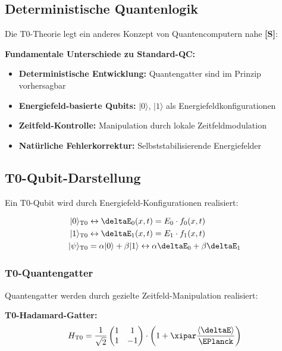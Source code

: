 	\subsection{Deterministische Quantenlogik}
	
	Die T0-Theorie legt ein anderes Konzept von Quantencomputern nahe \textbf{[S]}:
	
	\begin{tcolorbox}[colback=yellow!5!white,colframe=yellow!75!black,title=T0-Quantencomputer-Prinzipien]
		\textbf{Fundamentale Unterschiede zu Standard-QC:}
		\begin{itemize}
			\item \textbf{Deterministische Entwicklung:} Quantengatter sind im Prinzip vorhersagbar
			\item \textbf{Energiefeld-basierte Qubits:} $|0\rangle$, $|1\rangle$ als Energiefeldkonfigurationen
			\item \textbf{Zeitfeld-Kontrolle:} Manipulation durch lokale Zeitfeldmodulation
			\item \textbf{Natürliche Fehlerkorrektur:} Selbststabilisierende Energiefelder
		\end{itemize}
	\end{tcolorbox}
	
	\subsection{T0-Qubit-Darstellung}
	
	Ein T0-Qubit wird durch Energiefeld-Konfigurationen realisiert:
	
	\begin{align}
		|0\rangle_{\text{T0}} &\leftrightarrow \deltaE_0(x,t) = E_0 \cdot f_0(x,t) \\
		|1\rangle_{\text{T0}} &\leftrightarrow \deltaE_1(x,t) = E_1 \cdot f_1(x,t) \\
		|\psi\rangle_{\text{T0}} &= \alpha|0\rangle + \beta|1\rangle \leftrightarrow \alpha\deltaE_0 + \beta\deltaE_1
	\end{align}
	
	\subsubsection{T0-Quantengatter}
	
	Quantengatter werden durch gezielte Zeitfeld-Manipulation realisiert:
	
	\textbf{T0-Hadamard-Gatter:}
	\begin{equation}
		H_{\text{T0}} = \frac{1}{\sqrt{2}}\begin{pmatrix} 1 & 1 \\ 1 & -1 \end{pmatrix} \cdot \left(1 + \xipar \frac{\langle\deltaE\rangle}{\EPlanck}\right)
	\end{equation}
	
